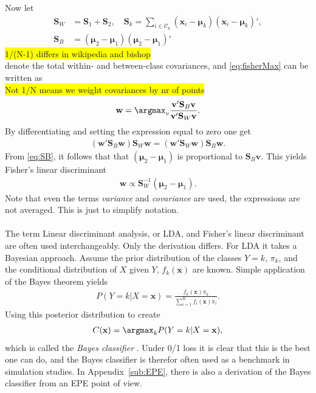 Now let 
\begin{align}
  \mathbf{S}_W &= \mathbf{S}_1 + \mathbf{S}_2, \quad  \mathbf{S}_k =  \sum_{i \in \mathcal{C}_k} (\mathbf{x}_i - \bm{\mu}_k)(\mathbf{x}_i - \bm{\mu}_k)', \\
  \label{eq:SB} 
  \mathbf{S}_B &= (\bm{\mu}_2 - \bm{\mu}_1)(\bm{\mu}_2 - \bm{\mu}_1)'
\end{align}
\colorbox{yellow}{1/(N-1) differs in wikipedia and bishop}\\
denote the total within- and between-class covariances, and \eqref{eq:fisherMax} can be written as
\\ \colorbox{yellow}{Not 1/N means we weight covariances by nr of points}\\
\begin{align}
  \mathbf{w} = \argmax_v  \frac{\mathbf{v}'\mathbf{S}_B \mathbf{v}}{\mathbf{v}' \mathbf{S}_W \mathbf{v}}.
\end{align}
By differentiating and setting the expression equal to zero one get
\begin{align}
  (\mathbf{w}' \mathbf{S}_B \mathbf{w})\mathbf{S}_W \mathbf{w} = (\mathbf{w}' \mathbf{S}_W \mathbf{w})\mathbf{S}_B \mathbf{w}.
\end{align}
From \eqref{eq:SB}, it follows that that $(\bm{\mu}_2 - \bm{\mu}_1)$ is proportional to $\mathbf{S}_B \mathbf{v}$. This yields Fisher's linear discriminant
\begin{align}
  \mathbf{w} \propto \mathbf{S}_W^{-1} (\bm \mu_2 - \bm \mu_1).
\end{align}
Note that even the terms \textit{variance} and \textit{covariance} are used, the expressions are not averaged. This is just to simplify notation. \\
\\
The term Linear discriminant analysis, or LDA, and Fisher's linear discriminant are often used interchangeably. Only the derivation differs. For LDA it takes a Bayesian approach. Assume the prior distribution of the classes $Y=k$, $\pi_k$, and the conditional distribution of $X$ given $Y$, $f_k(\mathbf{x})$ are known. Simple application of the Bayes theorem yields 
\begin{align}
  P(Y=k|X=\mathbf{x}) = \frac{f_k(\mathbf{x}) \pi_k}{\sum^{K}_{i=1} f_i(\mathbf{x})\pi_i} .
\end{align}
Using this posterior distribution to create
\begin{align}
  \label{eq:bayesian} 
  C(\mathbf{x}) = \argmax_k P(Y=k|X=\mathbf{x}),
\end{align}
which is called the \textit{Bayes classifier} \cite[p.~21]{modstat}. Under 0/1 loss it is clear that this is the best one can do, and the Bayes classifier is therefor often used as a benchmark in simulation studies. In Appendix~\ref{sub:EPE}, there is also a derivation of the Bayes classifier from an EPE point of view. 


